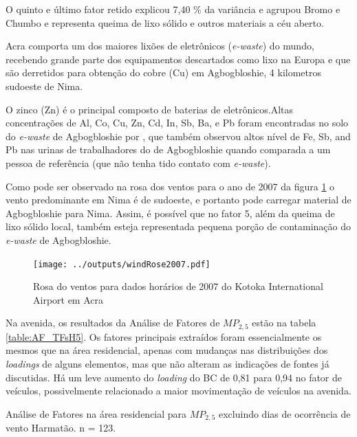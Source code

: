O quinto e último fator retido explicou 7,40 \% da variância e agrupou
Bromo e Chumbo e representa queima de lixo sólido e outros materiais a céu 
aberto. 

Acra comporta um dos maiores lixões de eletrônicos (\textit{e-waste}) 
do mundo, recebendo grande parte dos equipamentos descartados como lixo na 
Europa e que são derretidos para obtenção do cobre (Cu) em Agbogbloshie, 
4 kilometros sudoeste de Nima.  

O zinco (Zn) é o principal composto de baterias de eletrônicos.Altas 
concentrações de Al, Co, Cu, Zn, Cd, In, Sb, Ba, e Pb foram encontradas
no solo do \textit{e-waste} de Agbogbloshie por \citet{asante2012},
que também observou altos nível de Fe, Sb, and Pb nas urinas de trabalhadores 
do de Agbogbloshie quando comparada a um pessoa de referência
(que não tenha tido contato com \textit{e-waste}).

Como pode ser observado na rosa dos ventos para o ano de 2007 
da figura \ref{fg:rosa2007} o vento predominante em Nima é de sudoeste, 
e portanto pode carregar material de Agbogbloshie para Nima. 
Assim, é possível que no fator 5, além da queima de lixo sólido local, 
também esteja representada pequena porção de contaminação do 
\textit{e-waste} de Agbogbloshie.

\begin{figure}[H]
  \centering
  \texttt{[image: ../outputs/windRose2007.pdf]}
  \caption{Rosa do ventos para dados horários de 2007 do 
           Kotoka International Airport em Acra 
           \label{fg:rosa2007}}
\end{figure}%


Na avenida, os resultados da Análise de Fatores de $MP_{2,5}$ estão na 
tabela \ref{table:AF_TFsH5}. Os fatores principais extraídos 
foram essencialmente os mesmos que na área residencial, apenas com mudanças nas
distribuições dos \textit{loadings} de alguns elementos, mas que não alteram 
as indicações de fontes já discutidas. Há um leve aumento do \textit{loading} 
do BC de 0,81 para 0,94 no fator de veículos, possivelmente relacionado a
maior movimentação de veículos na avenida.

\newpage
\begin{table}[H]
  \centering
  
  \caption{Análise de Fatores na área residencial para $MP_{2,5}$
           excluindo dias de ocorrência de vento Harmatão. n = 123.
          \label{table:AF_RFsH5}}
\end{table}


